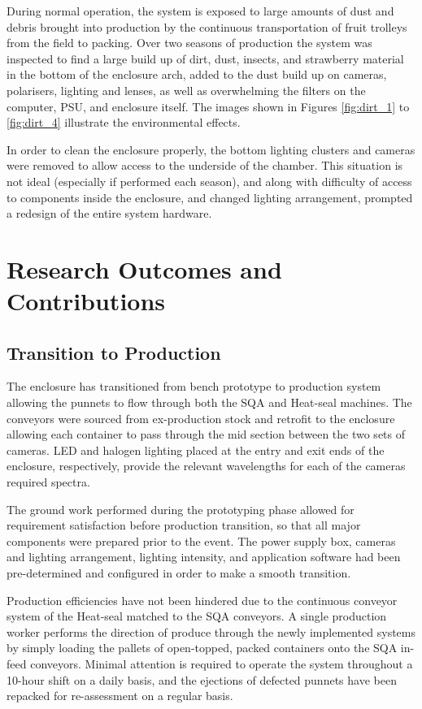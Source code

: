 \documentclass[fleqn,twoside,12pt]{report}
\begin{document}
During normal operation, the system is exposed to large amounts of dust and debris brought into production by the continuous transportation of fruit trolleys from the field to packing. Over two seasons of production the system was inspected to find a large build up of dirt, dust, insects, and strawberry material in the bottom of the enclosure arch, added to the dust build up on cameras, polarisers, lighting and lenses, as well as overwhelming the filters on the computer, PSU, and enclosure itself. The images shown in Figures \ref{fig:dirt_1} to \ref{fig:dirt_4}  illustrate the environmental effects.

In order to clean the enclosure properly, the bottom lighting clusters and cameras were removed to allow access to the underside of the chamber. This situation is not ideal (especially if performed each season), and along with difficulty of access to components inside the enclosure, and changed lighting arrangement, prompted a redesign of the entire system hardware. 






\section{Research Outcomes and Contributions}

\subsection{Transition to Production}

The enclosure has transitioned from bench prototype to production system allowing the punnets to flow through both the SQA and Heat-seal machines. The conveyors were sourced from ex-production stock and retrofit to the enclosure allowing each container to pass through the mid section between the two sets of cameras. LED and halogen lighting placed at the entry and exit ends of the enclosure, respectively, provide the relevant wavelengths for each of the cameras required spectra.

The ground work performed during the prototyping phase allowed for requirement satisfaction before production transition, so that all major components were prepared prior to the event. The power supply box, cameras and lighting arrangement, lighting intensity, and application software had been pre-determined and configured in order to make a smooth transition. 

Production efficiencies have not been hindered due to the continuous conveyor system of the Heat-seal matched to the SQA conveyors. A single production worker performs the direction of produce through the newly implemented systems by simply loading the pallets of open-topped, packed containers onto the SQA in-feed conveyors. Minimal attention is required to operate the system throughout a 10-hour shift on a daily basis, and the ejections of defected punnets have been repacked for re-assessment on a regular basis. 
\end{document}
